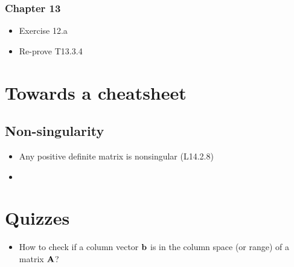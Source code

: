\documentclass[a4paper, oneside]{book}
\begin{document}
\subsection*{Chapter 13}
\begin{itemize}
\item Exercise 12.a
\item Re-prove T13.3.4
\end{itemize}



\clearpage
\chapter*{Towards a cheatsheet}
\section*{Non-singularity}
\begin{itemize}
\item Any positive definite matrix is nonsingular (L14.2.8)
\item 
\end{itemize}



\clearpage
\chapter*{Quizzes}
\begin{itemize}
\item How to check if a column vector $\mathbf{b}$ is in the column space (or range) of a matrix $\mathbf{A}$?\\
\end{itemize}








\end{document}
